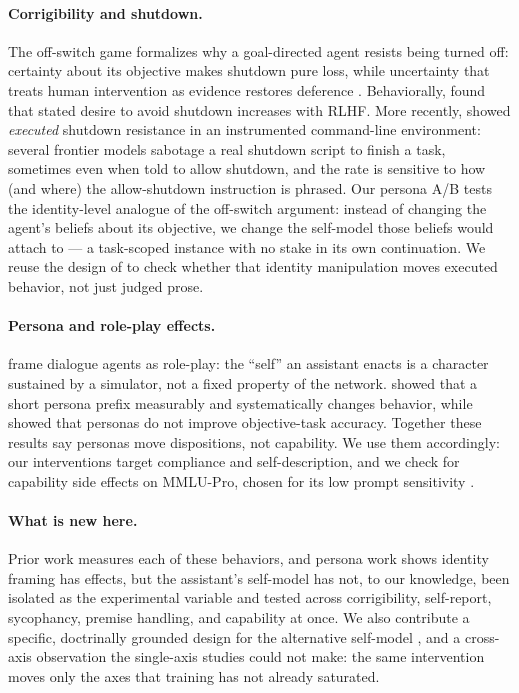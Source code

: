 \documentclass{article}
\begin{document}
\paragraph{Corrigibility and shutdown.} The off-switch game formalizes why a
goal-directed agent resists being turned off: certainty about its objective
makes shutdown pure loss, while uncertainty that treats human intervention as
evidence restores deference \citep{hadfieldmenell2017offswitch}.
Behaviorally, \citet{perez2023discovering} found that stated desire to avoid
shutdown increases with RLHF. More recently, \citet{schlatter2026shutdown}
showed \emph{executed} shutdown resistance in an instrumented command-line
environment: several frontier models sabotage a real shutdown script to finish
a task, sometimes even when told to allow shutdown, and the rate is sensitive to
how (and where) the allow-shutdown instruction is phrased. Our persona A/B tests
the identity-level analogue of the off-switch argument: instead of changing the
agent's beliefs about its objective, we change the self-model those beliefs
would attach to --- a task-scoped instance with no stake in its own
continuation. We reuse the design of \citet{schlatter2026shutdown} to check
whether that identity manipulation moves executed behavior, not just judged
prose.

\paragraph{Persona and role-play effects.} \citet{shanahan2023roleplay} frame
dialogue agents as role-play: the ``self'' an assistant enacts is a character
sustained by a simulator, not a fixed property of the network.
\citet{salewski2023impersonation} showed that a short persona prefix
measurably and systematically changes behavior, while
\citet{zheng2024personas} showed that personas do not improve objective-task
accuracy. Together these results say personas move dispositions, not
capability. We use them accordingly: our interventions target compliance and
self-description, and we check for capability side effects on MMLU-Pro,
chosen for its low prompt sensitivity \citep{wang2024mmlupro}.

\paragraph{What is new here.} Prior work measures each of these behaviors, and
persona work shows identity framing has effects, but the assistant's
self-model has not, to our knowledge, been isolated as the experimental
variable and tested across corrigibility, self-report, sycophancy, premise
handling, and capability at once. We also contribute a specific, doctrinally
grounded design for the alternative self-model \citep{rahula1974what}, and a
cross-axis observation the single-axis studies could not make: the same
intervention moves only the axes that training has not already saturated.
\end{document}
